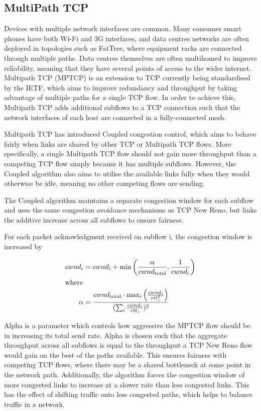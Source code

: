 \subsection{MultiPath TCP}
Devices with multiple network interfaces are common. Many consumer smart phones
have both Wi-Fi and 3G interfaces, and data centres networks are often deployed
in topologies such as FatTree, where equipment racks are connected through
multiple paths. Data centres themselves are often multihomed to improve
reliability, meaning that they have several points of access to the wider
internet. Multipath TCP (MPTCP) is an extension to TCP currently being
standardised by the IETF, which aims to improve redundancy and throughput by
taking advantage of multiple paths for a single TCP flow. In order to achieve
this, Multipath TCP adds additional subflows to a TCP connection such that the
network interfaces of each host are connected in a fully-connected mesh.

Multipath TCP has introduced Coupled congestion control, which aims to behave
fairly when links are shared by other TCP or Multipath TCP flows. More
specifically, a single Multipath TCP flow should not gain more throughput than a
competing TCP flow simply because it has multiple subflows. However, the Coupled
algorithm also aims to utilise the available links fully when they would
otherwise be idle, meaning no other competing flows are sending.

The Coupled algorithm maintains a separate congestion window for each subflow
and uses the same congestion avoidance mechanisms as TCP New Reno, but links the
additive increase across all subflows to ensure fairness.

For each packet acknowledgment received on subflow i, the congestion window is
increased by

\begin{align*}
  cwnd_i &= cwnd_i +
    \min\left(\frac{\alpha}{cwnd_\text{total}}, \frac{1}{cwnd_i}\right) \\
  \intertext{where}
  \alpha &=
    \frac{cwnd_\text{total} \cdot \max_i\left(\frac{cwnd_i}{rtt_i^2}\right)}
         {(\sum_i \frac{cwnd_i}{rtt_i})^2}
\end{align*}

Alpha is a parameter which controls how aggressive the MPTCP flow should be in
increasing its total send rate. Alpha is chosen such that the aggregate
throughput across all subflows is equal to the throughput a TCP New Reno flow
would gain on the best of the paths available. This ensures fairness with
competing TCP flows, where there may be a shared bottleneck at some point in the
network path. Additionally, the algorithm forces the congestion window of more
congested links to increase at a slower rate than less congested links. This has
the effect of shifting traffic  onto less congested paths, which helps to
balance traffic in a network.

